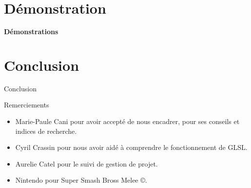 \documentclass{beamer}
\begin{document}
\section{Démonstration}
\begin{frame}
  \begin{center}
    \textbf{Démonstrations}
  \end{center}
\end{frame}

\section{Conclusion}
\begin{frame}{Conclusion}
\end{frame}

\begin{frame}{Remerciements}
  \begin{itemize}
  \item{Marie-Paule Cani} pour avoir accepté de nous encadrer, pour
    ses conseils et indices de recherche.
  \item{Cyril Crassin} pour nous avoir aidé à comprendre le
    fonctionnement de GLSL.
  \item{Aurelie Catel} pour le suivi de gestion de projet.
  \item{Nintendo\texttrademark} pour Super Smash Bross Melee ©.
  \end{itemize}
\end{frame}
\end{document}
